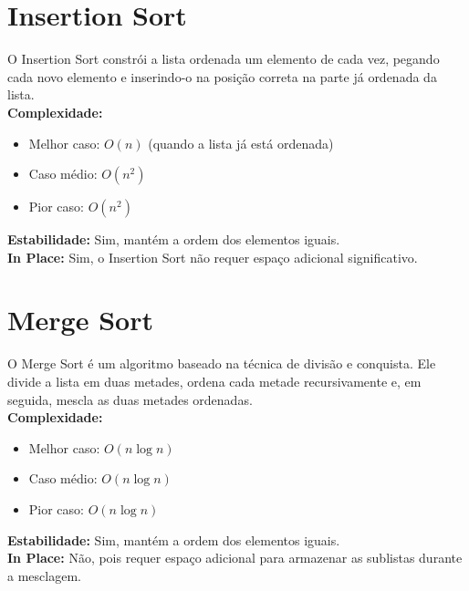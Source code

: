 \documentclass[tcc1,project]{uftex}
\begin{document}
\section{Insertion Sort}
O Insertion Sort constrói a lista ordenada um elemento de cada vez, pegando cada novo elemento e inserindo-o na posição correta na parte já ordenada da lista. \\
\textbf{Complexidade:}
\begin{itemize}
    \item Melhor caso: $O(n)$ (quando a lista já está ordenada)
    \item Caso médio: $O(n^2)$
    \item Pior caso: $O(n^2)$
    
\end{itemize}
\textbf{Estabilidade:} Sim, mantém a ordem dos elementos iguais. \\
\textbf{In Place:} Sim, o Insertion Sort não requer espaço adicional significativo. \\

\section{Merge Sort}
O Merge Sort é um algoritmo baseado na técnica de divisão e conquista. Ele divide a lista em duas metades, ordena cada metade recursivamente e, em seguida, mescla as duas metades ordenadas. \\
\textbf{Complexidade:}
\begin{itemize}
    \item Melhor caso: $O(n \log n)$
    \item Caso médio: $O(n \log n)$
    \item Pior caso: $O(n \log n)$
    
\end{itemize}
\textbf{Estabilidade:} Sim, mantém a ordem dos elementos iguais. \\
\textbf{In Place:} Não, pois requer espaço adicional para armazenar as sublistas durante a mesclagem. \\
\end{document}
